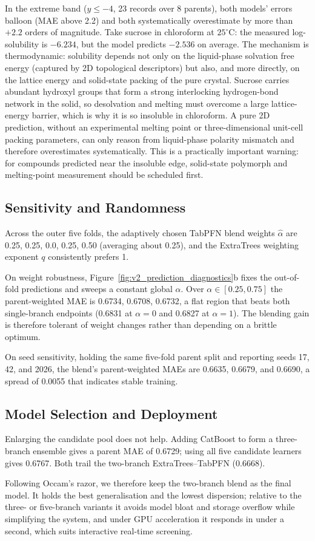 In the extreme band ($y \le -4$, 23 records over 8 parents), both models' errors balloon (MAE above 2.2) and both systematically overestimate by more than $+2.2$ orders of magnitude. Take sucrose in chloroform at $25^\circ\text{C}$: the measured log-solubility is $-6.234$, but the model predicts $-2.536$ on average. The mechanism is thermodynamic: solubility depends not only on the liquid-phase solvation free energy (captured by 2D topological descriptors) but also, and more directly, on the lattice energy and solid-state packing of the pure crystal. Sucrose carries abundant hydroxyl groups that form a strong interlocking hydrogen-bond network in the solid, so desolvation and melting must overcome a large lattice-energy barrier, which is why it is so insoluble in chloroform. A pure 2D prediction, without an experimental melting point or three-dimensional unit-cell packing parameters, can only reason from liquid-phase polarity mismatch and therefore overestimates systematically. This is a practically important warning: for compounds predicted near the insoluble edge, solid-state polymorph and melting-point measurement should be scheduled first.

\subsection{Sensitivity and Randomness}

Across the outer five folds, the adaptively chosen TabPFN blend weights $\widehat\alpha$ are 0.25, 0.25, 0.0, 0.25, 0.50 (averaging about 0.25), and the ExtraTrees weighting exponent $q$ consistently prefers 1.

On weight robustness, Figure~\ref{fig:v2_prediction_diagnostics}b fixes the out-of-fold predictions and sweeps a constant global $\alpha$. Over $\alpha \in [0.25, 0.75]$ the parent-weighted MAE is 0.6734, 0.6708, 0.6732, a flat region that beats both single-branch endpoints (0.6831 at $\alpha=0$ and 0.6827 at $\alpha=1$). The blending gain is therefore tolerant of weight changes rather than depending on a brittle optimum.

On seed sensitivity, holding the same five-fold parent split and reporting seeds 17, 42, and 2026, the blend's parent-weighted MAEs are 0.6635, 0.6679, and 0.6690, a spread of 0.0055 that indicates stable training.

\subsection{Model Selection and Deployment}

Enlarging the candidate pool does not help. Adding CatBoost to form a three-branch ensemble gives a parent MAE of 0.6729; using all five candidate learners gives 0.6767. Both trail the two-branch ExtraTrees--TabPFN (0.6668).

Following Occam's razor, we therefore keep the two-branch blend as the final model. It holds the best generalisation and the lowest dispersion; relative to the three- or five-branch variants it avoids model bloat and storage overflow while simplifying the system, and under GPU acceleration it responds in under a second, which suits interactive real-time screening.
